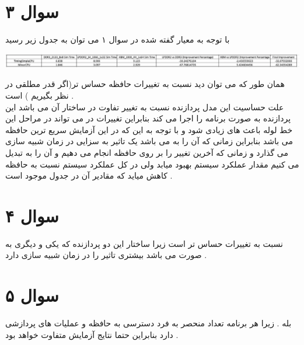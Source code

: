 \documentclass{article}
\begin{document}
\section*{سوال ۳}
با توجه به معیار گفته شده در سوال ۱ می توان به جدول زیر رسید 
\begin{center}
	\includegraphics[width=1\linewidth]{q3p1} 
\end{center}

همان طور که می توان دید 
\lr{\textcolor{red}{MinorCPU}}
نسبت به تغییرات حافظه حساس تر(اگر قدر مطلقی در نظر بگیریم ) است . \\
علت حساسیت این مدل پردازنده نسبت به تغییر تفاوت در ساختار آن می باشد این پردازنده به صورت 
برنامه را اجرا می کند بنابراین تغییرات در 
می تواند در مراحل این خط لوله باعث 
های زیادی شود و با توجه به این که در این آزمایش سریع ترین حافظه 
می باشد بنابراین زمانی که آن را به 
می باشد یک تاثیر به سزایی در زمان شبیه سازی می گذارد و زمانی که آخرین تغییر را بر روی حافظه انجام می دهیم و آن را به 
تبدیل می کنیم مقدار عملکرد سیستم بهبود میابد ولی در کل عملکرد سیستم نسبت به حافظه 
کاهش میاید که مقادیر آن در جدول موجود است  . 
\section*{سوال ۴}
نسبت به تغییرات 
حساس تر است زیرا ساختار این دو پردازنده که یکی 
و دیگری به صورت 
می باشد بیشتری تاثیر را در زمان شبیه سازی  دارد . 
\section*{سوال ۵}
بله . زیرا هر برنامه تعداد منحصر به فرد دسترسی به حافظه و عملیات های پردازشی دارد بنابراین حتما نتایج آزمایش متفاوت خواهد بود . 
\end{document}
